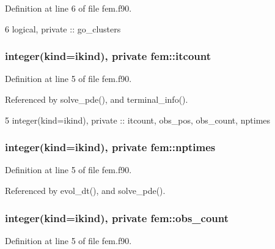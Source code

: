 Definition at line 6 of file fem.\+f90.


\begin{DoxyCode}
6   \textcolor{keywordtype}{logical}, \textcolor{keywordtype}{private} :: go\_clusters
\end{DoxyCode}
\subsubsection[{itcount}]{\setlength{\rightskip}{0pt plus 5cm}integer(kind=ikind), private fem\+::itcount\hspace{0.3cm}{\ttfamily [private]}}\label{namespacefem_a9fcd75e8e6ac205b26a35e505ad201fd}


Definition at line 5 of file fem.\+f90.



Referenced by solve\+\_\+pde(), and terminal\+\_\+info().


\begin{DoxyCode}
5   \textcolor{keywordtype}{integer(kind=ikind)}, \textcolor{keywordtype}{private} :: itcount, obs\_pos, obs\_count, nptimes
\end{DoxyCode}
\subsubsection[{nptimes}]{\setlength{\rightskip}{0pt plus 5cm}integer(kind=ikind), private fem\+::nptimes\hspace{0.3cm}{\ttfamily [private]}}\label{namespacefem_a227231170b93a2d5d8e051b311f83ee2}


Definition at line 5 of file fem.\+f90.



Referenced by evol\+\_\+dt(), and solve\+\_\+pde().

\subsubsection[{obs\+\_\+count}]{\setlength{\rightskip}{0pt plus 5cm}integer(kind=ikind), private fem\+::obs\+\_\+count\hspace{0.3cm}{\ttfamily [private]}}\label{namespacefem_a77462461fd7030fdceb0433c9daf566e}


Definition at line 5 of file fem.\+f90.



